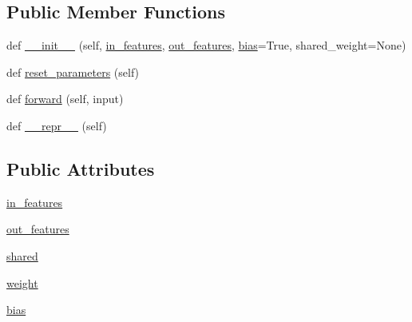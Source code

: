 \subsection*{Public Member Functions}
\begin{DoxyCompactItemize}
\item 
def \hyperlink{classparlai_1_1agents_1_1legacy__agents_1_1seq2seq_1_1modules__v0_1_1Linear_a961944a7bcebe7bee8c32967e505994d}{\+\_\+\+\_\+init\+\_\+\+\_\+} (self, \hyperlink{classparlai_1_1agents_1_1legacy__agents_1_1seq2seq_1_1modules__v0_1_1Linear_a79479f805ef73bba4f52a676999e06da}{in\+\_\+features}, \hyperlink{classparlai_1_1agents_1_1legacy__agents_1_1seq2seq_1_1modules__v0_1_1Linear_add537bbe47b10f383ff20b4244c2a38a}{out\+\_\+features}, \hyperlink{classparlai_1_1agents_1_1legacy__agents_1_1seq2seq_1_1modules__v0_1_1Linear_add46cc133ca8a969cee42cef77c87466}{bias}=True, shared\+\_\+weight=None)
\item 
def \hyperlink{classparlai_1_1agents_1_1legacy__agents_1_1seq2seq_1_1modules__v0_1_1Linear_a1ec65604d05f105801a61de18d16caa1}{reset\+\_\+parameters} (self)
\item 
def \hyperlink{classparlai_1_1agents_1_1legacy__agents_1_1seq2seq_1_1modules__v0_1_1Linear_a5114a45ac1b8e2a07c399da5bff760be}{forward} (self, input)
\item 
def \hyperlink{classparlai_1_1agents_1_1legacy__agents_1_1seq2seq_1_1modules__v0_1_1Linear_aad59400f7c8edf9b07305749b928186b}{\+\_\+\+\_\+repr\+\_\+\+\_\+} (self)
\end{DoxyCompactItemize}
\subsection*{Public Attributes}
\begin{DoxyCompactItemize}
\item 
\hyperlink{classparlai_1_1agents_1_1legacy__agents_1_1seq2seq_1_1modules__v0_1_1Linear_a79479f805ef73bba4f52a676999e06da}{in\+\_\+features}
\item 
\hyperlink{classparlai_1_1agents_1_1legacy__agents_1_1seq2seq_1_1modules__v0_1_1Linear_add537bbe47b10f383ff20b4244c2a38a}{out\+\_\+features}
\item 
\hyperlink{classparlai_1_1agents_1_1legacy__agents_1_1seq2seq_1_1modules__v0_1_1Linear_afa722c4a409a6e2b981874a8a472e892}{shared}
\item 
\hyperlink{classparlai_1_1agents_1_1legacy__agents_1_1seq2seq_1_1modules__v0_1_1Linear_ab561a82edc15dcd7509618466d2f684f}{weight}
\item 
\hyperlink{classparlai_1_1agents_1_1legacy__agents_1_1seq2seq_1_1modules__v0_1_1Linear_add46cc133ca8a969cee42cef77c87466}{bias}
\end{DoxyCompactItemize}


